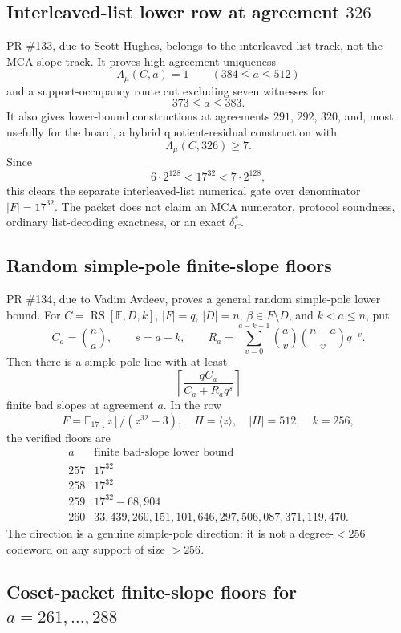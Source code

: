 \documentclass[11pt]{article}
\newcommand{\F}{\mathbb F}
\newcommand{\RS}{\operatorname{RS}}
\begin{document}
\subsection{Interleaved-list lower row at agreement \(326\)}

PR \#133, due to Scott Hughes, belongs to the interleaved-list track, not the
MCA slope track.  It proves high-agreement uniqueness
\[
  \Lambda_\mu(C,a)=1\qquad (384\le a\le512)
\]
and a support-occupancy route cut excluding seven witnesses for
\[
  373\le a\le383.
\]
It also gives lower-bound constructions at agreements \(291\), \(292\), \(320\),
and, most usefully for the board, a hybrid quotient-residual construction with
\[
  \Lambda_\mu(C,326)\ge7 .
\]
Since
\[
  6\cdot2^{128}<17^{32}<7\cdot2^{128},
\]
this clears the separate interleaved-list numerical gate over denominator
\(|F|=17^{32}\).  The packet does not claim an MCA numerator, protocol
soundness, ordinary list-decoding exactness, or an exact \(\delta_C^*\).

\subsection{Random simple-pole finite-slope floors}

PR \#134, due to Vadim Avdeev, proves a general random simple-pole lower bound.
For \(C=\RS[\F,D,k]\), \(|F|=q\), \(|D|=n\), \(\beta\in F\setminus D\), and
\(k<a\le n\), put
\[
  C_a=\binom{n}{a},\qquad s=a-k,\qquad
  R_a=\sum_{v=0}^{a-k-1}
        \binom{a}{v}\binom{n-a}{v}q^{-v}.
\]
Then there is a simple-pole line with at least
\[
  \left\lceil
    \frac{qC_a}{C_a+R_aq^s}
  \right\rceil
\]
finite bad slopes at agreement \(a\).  In the row
\[
  F=\F_{17}[z]/(z^{32}-3),\quad H=\langle z\rangle,\quad |H|=512,\quad k=256,
\]
the verified floors are
\[
\begin{array}{c|c}
a & \text{finite bad-slope lower bound}\\
\hline
257 & 17^{32}\\
258 & 17^{32}\\
259 & 17^{32}-68{,}904\\
260 & 33{,}439{,}260{,}151{,}101{,}646{,}297{,}506{,}087{,}371{,}119{,}470 .
\end{array}
\]
The direction is a genuine simple-pole direction: it is not a degree-\(<256\)
codeword on any support of size \(>256\).

\subsection{Coset-packet finite-slope floors for \(a=261,\ldots,288\)}
\end{document}
